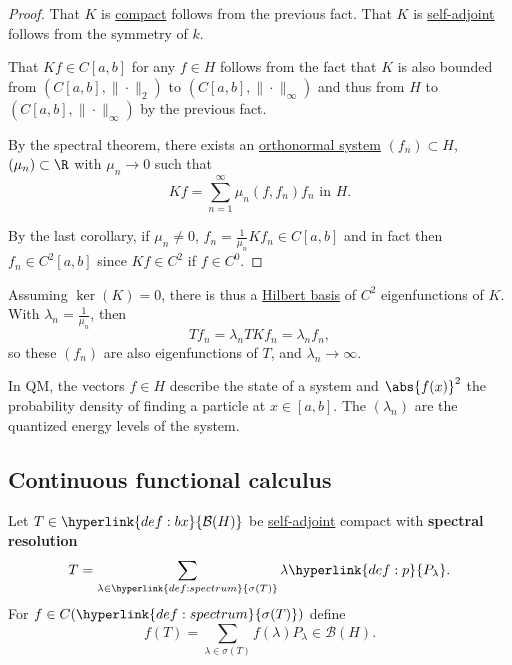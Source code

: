 \documentclass{article}
\begin{document}
\begin{proof}
    That $K$ is \hyperlink{def:compact}{compact} follows from the previous fact.
    That $K$ is \hyperlink{def:normalMap}{self-adjoint} follows from the symmetry of $k$.

    That $Kf \in C[a,b]$ for any $f \in H$ follows from the fact that $K$ is also bounded from $(C[a,b], \|\cdot\|_2)$ to $(C[a,b],\|\cdot\|_\infty)$ and thus from $H$ to $(C[a,b], \|\cdot\|_\infty)$ by the previous fact.

    By the spectral theorem, there exists an \hyperlink{def:ons}{orthonormal system} $(f_n) \subset H$, $(\mu_n) \subset \R$ with $\mu_n \to 0$ such that
    \begin{equation*}
        Kf = \sum_{n=1}^\infty \mu_n (f, f_n) f_n \text{  in } H.
    \end{equation*}

    By the last corollary, if $\mu_n \neq 0$, $f_n = \frac{1}{\mu_n} K f_n \in C[a,b]$ and in fact then $f_n \in C^2 [a,b]$ since $Kf \in C^2$ if $f \in C^0$.
\end{proof}

Assuming $\ker(K) = 0$, there is thus a \hyperlink{def:basis}{Hilbert basis} of $C^2$ eigenfunctions of $K$.
With $\lambda_n = \frac{1}{\mu_n}$, then
\begin{equation*}
    T f_n = \lambda_n T K f_n = \lambda_n f_n,
\end{equation*}
so these $(f_n)$ are also eigenfunctions of $T$, and $\lambda_n \to \infty$.

In QM, the vectors $f \in H$ describe the state of a system and $\abs{f(x)}^2$ the probability density of finding a particle at $x \in [a,b]$. The $(\lambda_n)$ are the quantized energy levels of the system.


\subsection{Continuous functional calculus}
Let $T \in \hyperlink{def:bx}{\mathcal{B}(H)}$ be \hyperlink{def:normalMap}{self-adjoint} compact with \textbf{spectral resolution}
\begin{equation*}
    T = \sum_{\lambda \in \hyperlink{def:spectrum}{\sigma(T)}} \lambda \hyperlink{def:p}{P_\lambda}.
\end{equation*}
For $f \in C(\hyperlink{def:spectrum}{\sigma(T)})$ define
\begin{equation*}
    f(T) = \sum_{\lambda \in \sigma(T)} f(\lambda) P_\lambda \in \mathcal{B}(H).
\end{equation*}
\end{document}
